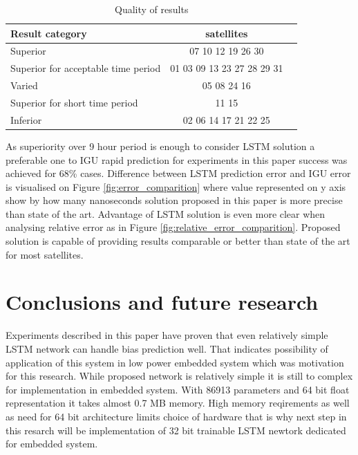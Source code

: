 \documentclass{article}
\begin{document}
\begin{table}[htb] \label{table:result}
\parindent0pt
\caption{Quality of results }
\centering
\begin{tabular}{ l  c  c }
  \hline
  \hline
  Result category & satellites\\  \hline
  Superior & 07 10 12 19 26 30\\  
  Superior for acceptable time period& 01 03 09 13 23 27 28 29 31\\ 
  Varied & 05 08 24 16\\ \hline \hline
  Superior for short time period& 11 15 \\ 
  Inferior & 02 06 14 17 21 22 25\\ 
 \end{tabular}
\end{table}

As superiority over 9 hour period is enough to consider LSTM solution a preferable one to
IGU rapid prediction for experiments in this paper success was achieved for 68\% 
cases.
Difference between LSTM prediction error and IGU error is visualised on Figure 
\ref{fig:error_comparition} where value represented on y axis show by how many nanoseconds 
solution proposed in this paper is more precise than state of the art.
Advantage of LSTM solution is even more clear when analysing relative error as in Figure
\ref{fig:relative_error_comparition}. Proposed solution is capable of providing results 
comparable or better than state of the art for most satellites.

\section{Conclusions and future research}
Experiments described in this paper have proven that even relatively simple LSTM network can
handle bias prediction well. That indicates possibility of application of this system in 
low power embedded system which was motivation for this research.
While proposed network is relatively simple it is still to complex for implementation in 
embedded system. With 86913 parameters and 64 bit float representation it takes almost 0.7 MB
memory.
High memory reqirements as well as need for 64 bit architecture limits choice of hardware that
is why next step in this resarch will be implementation of 32 bit trainable LSTM newtork
dedicated for embedded system.

\FloatBarrier
\end{document}
